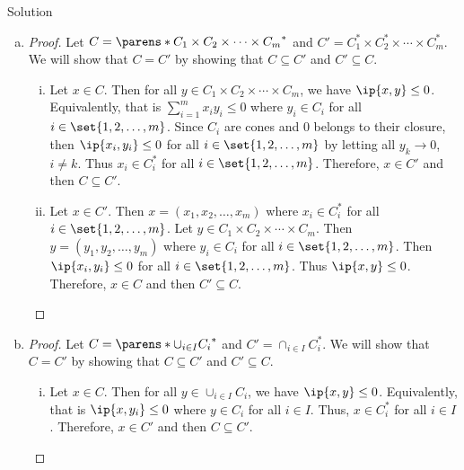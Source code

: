 \documentclass{article}
\theoremstyle{plain}
\theoremstyle{definition}
\theoremstyle{remark}
\begin{document}
\begin{solution}
    {Solution}
    \begin{enumerate}[(a)]
        \item {
            \begin{proof}
                Let $C=\parens*{C_1 \times C_2 \times \cdots \times C_m}^*$ and $C' = C_1^*\times C_2^* \times \cdots \times C_m^*$. We will show that $C=C'$ by showing that $C\subseteq C'$ and $C'\subseteq C$.
                \begin{enumerate}[(i)]
                    \item {
                        Let $x\in C$. Then for all $y\in C_1\times C_2\times\cdots\times C_m$, we have $\ip{x,y}\leq 0$. Equivalently, that is $\sum_{i=1}^{m}x_i y_i\leq0$ where $y_i\in C_i$ for all $i\in\set{1,2,\ldots,m}$. Since $C_i$ are cones and $0$ belongs to their closure,  then $\ip{x_i,y_i}\leq 0$ for all $i\in\set{1,2,\ldots,m}$ by letting all $y_k\rightarrow 0$, $i\neq k$. Thus $x_i\in C_i^*$ for all $i\in\set{1,2,\ldots,m}$. Therefore, $x\in C'$ and then $C\subseteq C'$.
                    }
                    \item {
                        Let $x\in C'$. Then $x=(x_1,x_2,\ldots,x_m)$ where $x_i\in C_i^*$ for all $i\in\set{1,2,\ldots,m}$. Let $y\in C_1\times C_2\times\cdots\times C_m$. Then $y=(y_1,y_2,\ldots,y_m)$ where $y_i\in C_i$ for all $i\in\set{1,2,\ldots,m}$. Then $\ip{x_i,y_i}\leq 0$ for all $i\in\set{1,2,\ldots,m}$. Thus $\ip{x,y}\leq 0$. Therefore, $x\in C$ and then $C'\subseteq C$.
                    }
                \end{enumerate}
            \end{proof}
        }
        \item {
            \begin{proof}
                Let $C=\parens*{\cup_{i\in I}C_i}^*$ and $C'=\cap_{i\in I}C_i^*$. We will show that $C=C'$ by showing that $C\subseteq C'$ and $C'\subseteq C$.
                \begin{enumerate}[(i)]
                    \item {
                        Let $x\in C$. Then for all $y\in \cup_{i\in I}C_i$, we have $\ip{x,y}\leq 0$. Equivalently, that is $\ip{x,y_i}\leq0$ where $y\in C_i$ for all $i\in I$. Thus, $x\in C_i^*$ for all $i\in I$. Therefore, $x\in C'$ and then $C\subseteq C'$.
                    }

\end{enumerate}
\end{proof}}
\end{enumerate}
\end{solution}
\end{document}

